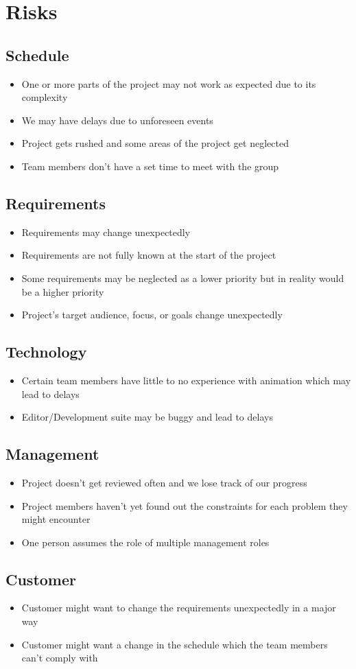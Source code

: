 \section{Risks}
\label{sec:risks}
\subsection{Schedule}
\begin{itemize}
 \item One or more parts of the project may not work as expected due to its complexity
 \item We may have delays due to unforeseen events
 \item Project gets rushed and some areas of the project get neglected
 \item Team members don’t have a set time to meet with the group
\end{itemize}

\subsection{Requirements}
\begin{itemize}
 \item Requirements may change unexpectedly
 \item Requirements are not fully known at the start of the project
 \item Some requirements may be neglected as a lower priority but in reality would be a higher priority
 \item Project’s target audience, focus, or goals change unexpectedly
\end{itemize}

\subsection{Technology}
\begin{itemize}
 \item Certain team members have little to no experience with animation which may lead to delays
 \item Editor/Development suite may be buggy and lead to delays
\end{itemize}

\subsection{Management}
\begin{itemize}
 \item Project doesn’t get reviewed often and we lose track of our progress
 \item Project members haven’t yet found out the constraints for each problem they might encounter
 \item One person assumes the role of multiple management roles
\end{itemize}

\subsection{Customer}
\begin{itemize}
 \item Customer might want to change the requirements unexpectedly in a major way
 \item Customer might want a change in the schedule which the team members can’t comply with
\end{itemize}
